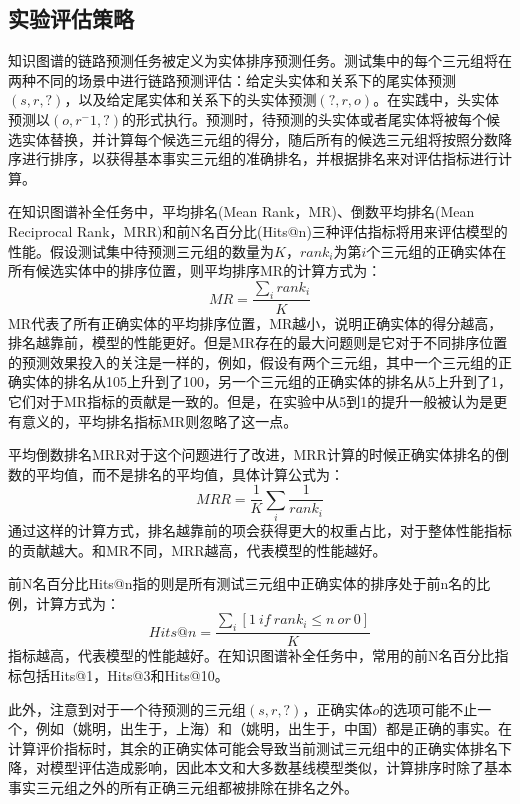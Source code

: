 \subsection{实验评估策略}

知识图谱的链路预测任务被定义为实体排序预测任务。测试集中的每个三元组将在两种不同的场景中进行链路预测评估：给定头实体和关系下的尾实体预测$(s,r,?)$，以及给定尾实体和关系下的头实体预测$(?,r,o)$。在实践中，头实体预测以$(o,r^-1,?)$的形式执行。预测时，待预测的头实体或者尾实体将被每个候选实体替换，并计算每个候选三元组的得分，随后所有的候选三元组将按照分数降序进行排序，以获得基本事实三元组的准确排名，并根据排名来对评估指标进行计算。

在知识图谱补全任务中，平均排名(Mean Rank，MR)、倒数平均排名(Mean Reciprocal Rank，MRR)和前N名百分比(Hits@n)三种评估指标将用来评估模型的性能。假设测试集中待预测三元组的数量为$K$，$rank_i$为第$i$个三元组的正确实体在所有候选实体中的排序位置，则平均排序MR的计算方式为：
\begin{equation}
    MR = \frac{\sum_i rank_i}{K}
\end{equation}
MR代表了所有正确实体的平均排序位置，MR越小，说明正确实体的得分越高，排名越靠前，模型的性能更好。但是MR存在的最大问题则是它对于不同排序位置的预测效果投入的关注是一样的，例如，假设有两个三元组，其中一个三元组的正确实体的排名从105上升到了100，另一个三元组的正确实体的排名从5上升到了1，它们对于MR指标的贡献是一致的。但是，在实验中从5到1的提升一般被认为是更有意义的，平均排名指标MR则忽略了这一点。

平均倒数排名MRR对于这个问题进行了改进，MRR计算的时候正确实体排名的倒数的平均值，而不是排名的平均值，具体计算公式为：
\begin{equation}
    MRR = \frac{1}{K} \sum_i \frac{1}{rank_i}
\end{equation}
通过这样的计算方式，排名越靠前的项会获得更大的权重占比，对于整体性能指标的贡献越大。和MR不同，MRR越高，代表模型的性能越好。

前N名百分比Hits@n指的则是所有测试三元组中正确实体的排序处于前n名的比例，计算方式为：
\begin{equation}
    Hits@n = \frac{\sum_i \left[1 \ if \ rank_i \leq n \ or \ 0\right] }{K}
\end{equation}
指标越高，代表模型的性能越好。在知识图谱补全任务中，常用的前N名百分比指标包括Hits@1，Hits@3和Hits@10。

此外，注意到对于一个待预测的三元组$(s,r,?)$，正确实体$o$的选项可能不止一个，例如（姚明，出生于，上海）和（姚明，出生于，中国）都是正确的事实。在计算评价指标时，其余的正确实体可能会导致当前测试三元组中的正确实体排名下降，对模型评估造成影响，因此本文和大多数基线模型类似，计算排序时除了基本事实三元组之外的所有正确三元组都被排除在排名之外。

